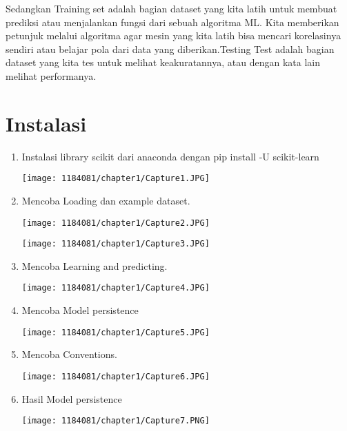 \documentclass{article}
\begin{document}
\hspace{1cm} Sedangkan Training set adalah bagian dataset yang kita latih untuk membuat prediksi atau menjalankan fungsi dari sebuah algoritma ML. Kita memberikan petunjuk melalui algoritma agar mesin yang kita latih bisa mencari korelasinya sendiri atau belajar pola dari data yang diberikan.Testing Test adalah bagian dataset yang kita tes untuk melihat keakuratannya, atau dengan kata lain melihat performanya.


\section{Instalasi}
\begin{enumerate}
    \item Instalasi library scikit dari anaconda dengan pip install -U scikit-learn
     \begin{center}
    \texttt{[image: 1184081/chapter1/Capture1.JPG]}
    \end{center}
    \item Mencoba Loading dan example dataset.
    \begin{center}
    \texttt{[image: 1184081/chapter1/Capture2.JPG]}
    \end{center}
     \begin{center}
    \texttt{[image: 1184081/chapter1/Capture3.JPG]}
    \end{center}
    \item Mencoba Learning and predicting.
    \begin{center}
    \texttt{[image: 1184081/chapter1/Capture4.JPG]}
    \end{center}
    \item Mencoba Model persistence
    \begin{center}
    \texttt{[image: 1184081/chapter1/Capture5.JPG]}
    \end{center}
    \item Mencoba Conventions.
     \begin{center}
    \texttt{[image: 1184081/chapter1/Capture6.JPG]}
    \end{center}
    \item Hasil Model persistence
     \begin{center}
    \texttt{[image: 1184081/chapter1/Capture7.PNG]}
    \end{center}
\end{enumerate}
\end{document}
